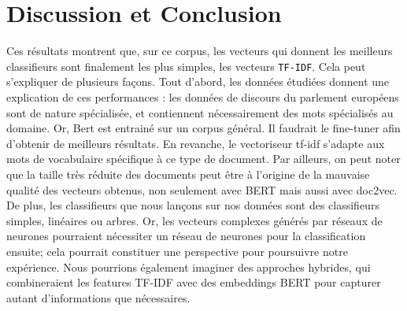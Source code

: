 \section{Discussion et Conclusion}

Ces résultats montrent que, sur ce corpus, les vecteurs qui donnent les meilleurs classifieurs sont finalement les plus simples, les vecteurs \texttt{TF-IDF}. Cela peut s'expliquer de plusieurs façons. Tout d'abord, les données étudiées donnent une explication de ces performances : les données de discours du parlement européens sont de nature spécialisée, et contiennent nécessairement des mots spécialisés au domaine. Or, Bert est entrainé sur un corpus général. Il faudrait le fine-tuner afin d'obtenir de meilleurs résultats. En revanche, le vectoriseur tf-idf s'adapte aux mots de vocabulaire spécifique à ce type de document. Par ailleurs, on peut noter que la taille très réduite des documents peut être à l'origine de la mauvaise qualité des vecteurs obtenus, non seulement avec BERT mais aussi avec doc2vec. De plus, les classifieurs que nous lançons sur nos données sont des classifieurs simples, linéaires ou arbres. Or, les vecteurs complexes générés par réseaux de neurones pourraient nécessiter un réseau de neurones pour la classification ensuite; cela pourrait constituer une perspective pour poursuivre notre expérience. Nous pourrions également imaginer des approches hybrides, qui combineraient les features TF-IDF avec des embeddings BERT pour capturer autant d'informations que nécessaires.